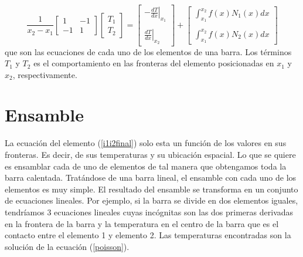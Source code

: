 \documentclass[10pt,a4paper]{article}
\begin{document}
\begin{equation}\label{i1i2final}
 \frac{1}{x_2-x_1}\left [\begin{array}{cc}
                               1 & -1 \\
                               -1 & 1 
                         \end{array}
                  \right]
                  \left [\begin{array}{c}
                               T_1 \\
                               T_2 
                         \end{array}
                  \right] = \left [\begin{array}{c}
                                        -\left .\frac{dT}{dx}\right |_{x_1} \\
                                                            \\
                                         \left .\frac{dT}{dx}\right |_{x_2}
                                   \end{array}
                            \right] +
                            \left [\begin{array}{c}
                                         \int_{x_1}^{x_2}f(x)N_1(x)dx \\
                                                                      \\
                                         \int_{x_1}^{x_2}f(x)N_2(x)dx
                                   \end{array} \right] 
\end{equation}
\noindent que son las ecuaciones de cada uno de los elementos de una barra. Los t\'erminos $T_1$ y $T_2$ es el comportamiento en las fronteras del elemento posicionadas en $x_1$ y $x_2$, respectivamente.

\section{Ensamble}

La ecuaci\'on del elemento (\ref{i1i2final}) solo esta un funci\'on de los valores en sus fronteras. Es decir, de sus temperaturas y su ubicaci\'on espacial. Lo que se quiere es ensamblar cada de uno de elementos de tal manera que obtengamos toda la barra calentada. Trat\'andose de una barra lineal, el ensamble con cada uno de los elementos es muy simple. El resultado del ensamble se transforma en un conjunto de ecuaciones lineales. Por ejemplo, si la barra se divide en dos elementos iguales, tendr\'iamos 3 ecuaciones lineales cuyas inc\'ognitas son las dos primeras derivadas en la frontera de la barra y la temperatura en el centro de la barra que es el contacto entre el elemento 1 y elemento 2. Las temperaturas encontradas son la soluci\'on de la ecuaci\'on (\ref{poisson}).
\end{document}
